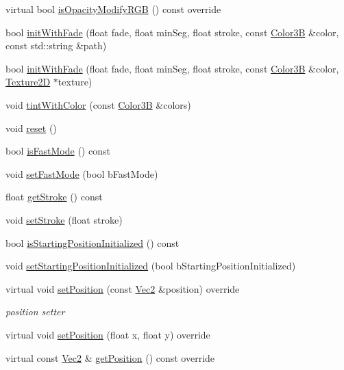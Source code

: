 \begin{DoxyCompactItemize}
\item 
virtual bool \hyperlink{classMotionStreak_a9cadee9d318c3bbc1e299563e0ce8d97}{is\+Opacity\+Modify\+R\+GB} () const override
\item 
bool \hyperlink{classMotionStreak_a2691831b200b8426ed8bf6d0dfd688d9}{init\+With\+Fade} (float fade, float min\+Seg, float stroke, const \hyperlink{structColor3B}{Color3B} \&color, const std\+::string \&path)
\item 
bool \hyperlink{classMotionStreak_a5905898a3f71dad4c4582988556878a4}{init\+With\+Fade} (float fade, float min\+Seg, float stroke, const \hyperlink{structColor3B}{Color3B} \&color, \hyperlink{classTexture2D}{Texture2D} $\ast$texture)
\item 
void \hyperlink{classMotionStreak_afc5b74bffba734239d696a2f333c2734}{tint\+With\+Color} (const \hyperlink{structColor3B}{Color3B} \&colors)
\item 
void \hyperlink{classMotionStreak_accbce67250d3b95ee9bf6b81c5854d44}{reset} ()
\item 
bool \hyperlink{classMotionStreak_a6198d0182d9c932af19a7517419e76dc}{is\+Fast\+Mode} () const
\item 
void \hyperlink{classMotionStreak_ac05305e418ee7cf9573cb373b651140f}{set\+Fast\+Mode} (bool b\+Fast\+Mode)
\item 
float \hyperlink{classMotionStreak_adef21bada492d363a843ae275aceebdd}{get\+Stroke} () const
\item 
void \hyperlink{classMotionStreak_abba05cb77e5d622147577add730d15b9}{set\+Stroke} (float stroke)
\item 
bool \hyperlink{classMotionStreak_a68d95751d1dda2b0e293262bb49e54f5}{is\+Starting\+Position\+Initialized} () const
\item 
void \hyperlink{classMotionStreak_af5c5821339dbf85b0ec3277316a04198}{set\+Starting\+Position\+Initialized} (bool b\+Starting\+Position\+Initialized)
\item 
virtual void \hyperlink{classMotionStreak_a2b77305ae80661b9508b928cf0a1699d}{set\+Position} (const \hyperlink{classVec2}{Vec2} \&position) override
\begin{DoxyCompactList}\small\item\em position setter \end{DoxyCompactList}\item 
virtual void \hyperlink{classMotionStreak_a5aee78ffa74f687a09d9167b8da6d075}{set\+Position} (float x, float y) override
\item 
virtual const \hyperlink{classVec2}{Vec2} \& \hyperlink{classMotionStreak_a73f3dcb75380855a39c6ff9eee475d80}{get\+Position} () const override

\end{DoxyCompactItemize}
